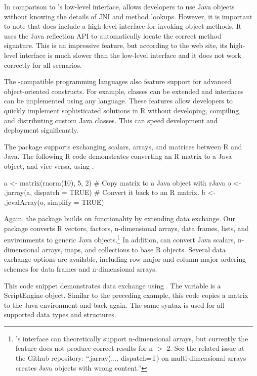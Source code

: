 In comparison to 's low-level interface,  allows developers to use Java objects without knowing the details of JNI and method lookups. However, it is important to note that  does include a high-level interface for invoking object methods. It uses the Java reflection API to automatically locate the correct method signature. This is an impressive feature, but according to the  web site, its high-level interface is much slower than the low-level interface and it does not work correctly for all scenarios.

The -compatible programming languages also feature support for advanced object-oriented constructs. For example, classes can be extended and interfaces can be implemented using any language. These features allow developers to quickly implement sophisticated solutions in R without developing, compiling, and distributing custom Java classes. This can speed development and deployment significantly.

The  package supports exchanging scalars, arrays, and matrices between R and Java. The following R code demonstrates converting an R matrix to a Java object, and vice versa, using .

\begin{example}
a <- matrix(rnorm(10), 5, 2)
# Copy matrix to a Java object with rJava
o <- .jarray(a, dispatch = TRUE)
# Convert it back to an R matrix.
b <- .jevalArray(o, simplify = TRUE)
\end{example}

Again, the  package builds on  functionality by extending data exchange. Our package converts R vectors, factors, n-dimensional arrays, data frames, lists, and environments to generic Java objects.\footnote{'s interface can theoretically support n-dimensional arrays, but currently the feature does not produce correct results for n $>$ 2. See the related issue at the  Github repository: ``.jarray(..., dispatch=T) on multi-dimensional arrays creates Java objects with wrong content.''} In addition,  can convert Java scalars, n-dimensional arrays, maps, and collections to base R objects. Several data exchange options are available, including row-major and column-major ordering schemes for data frames and n-dimensional arrays.

This code snippet demonstrates data exchange using . The variable  is a  ScriptEngine object. Similar to the preceding  example, this code copies a matrix to the Java environment and back again. The same syntax is used for all supported data types and structures.

